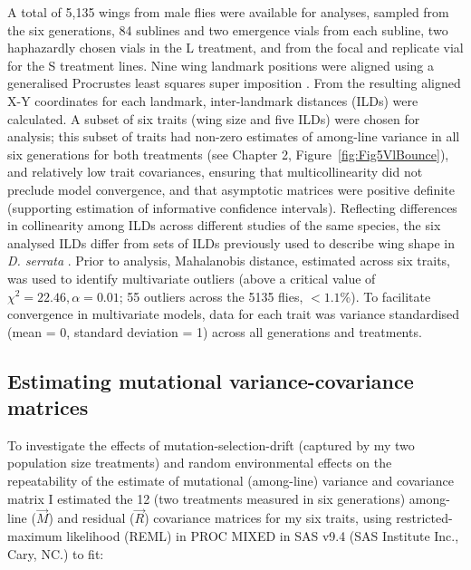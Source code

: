 A total of 5,135 wings from male flies were available for analyses, sampled from the six generations, 84 sublines and two emergence vials from each subline, two haphazardly chosen vials in the L treatment, and from the focal and replicate vial for the S treatment lines. Nine wing landmark positions were aligned using a generalised Procrustes least squares super imposition \citep{Rohl07}. From the resulting aligned X-Y coordinates for each landmark, inter-landmark distances (ILDs) were calculated. A subset of six traits (wing size and five ILDs) were chosen for analysis; this subset of traits had non-zero estimates of among-line variance in all six generations for both treatments (see Chapter 2, Figure~\ref{fig:Fig5VlBounce}), and relatively low trait covariances, ensuring that multicollinearity did not preclude model convergence, and that asymptotic matrices were positive definite (supporting estimation of informative confidence intervals). Reflecting differences in collinearity among ILDs across different studies of the same species, the six analysed ILDs differ from sets of ILDs previously used to describe wing shape in \textit{D. serrata} \citep{McGu13, McGu15}. Prior to analysis, Mahalanobis distance, estimated across six traits, was used to identify multivariate outliers (above a critical value of $\chi^2 = 22.46, \alpha =0.01$; 55 outliers across the 5135 flies, $< 1.1$\%). To facilitate convergence in multivariate models, data for each trait was variance standardised (mean = 0, standard deviation = 1) across all generations and treatments.\par

\subsection{Estimating mutational variance-covariance matrices}
To investigate the effects of mutation-selection-drift (captured by my two population size treatments) and random environmental effects on the repeatability of the estimate of mutational (among-line) variance and covariance matrix I estimated the 12 (two treatments measured in six generations) among-line ($\vec{M}$) and residual ($\vec{R}$) covariance matrices for my six traits, using restricted-maximum likelihood (REML) in PROC MIXED in SAS v9.4 (SAS Institute Inc., Cary, NC.) to fit:


